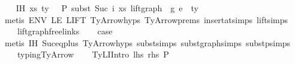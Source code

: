 \begin{isabellebody}
\isanewline
\ \ \isamarkupfalse%
\ IH{\isacharcolon}{\kern0pt}\ {\isachardoublequoteopen}{\isacharparenleft}{\kern0pt}xs{\isacharprime}{\kern0pt}{\isacharcomma}{\kern0pt}\ ty{}{\isacharprime}{\kern0pt}{\isacharparenright}{\kern0pt}\ {\isacharhash}{\kern0pt}\ {\isasymGamma}{}\ {\isasymturnstile}{\isacharbraceleft}{\kern0pt}P{\isacharbraceright}{\kern0pt}\ {\isacharparenleft}{\kern0pt}subst\ {\isacharparenleft}{\kern0pt}Suc\ i{\isacharparenright}{\kern0pt}\ xs\ {\isacharparenleft}{\kern0pt}lift{\isacharunderscore}{\kern0pt}graph\ {}\ g{}{\isacharparenright}{\kern0pt}{\isacharparenright}{\kern0pt}\ e{\isacharprime}{\kern0pt}\ {\isacharcolon}{\kern0pt}\ ty{}{\isacharprime}{\kern0pt}{\isachardoublequoteclose}\isanewline
\ \ \ \ \isamarkupfalse%
\ {\isacharparenleft}{\kern0pt}metis\ ENV\ LE\ LIFT{}\ TyArrow{\isachardot}{\kern0pt}hyps{\isacharparenleft}{\kern0pt}{}{\isacharparenright}{\kern0pt}\ TyArrow{\isachardot}{\kern0pt}prems{\isacharparenleft}{\kern0pt}{}{\isacharcomma}{\kern0pt}{}{\isacharparenright}{\kern0pt}\ insert{\isacharunderscore}{\kern0pt}at{\isachardot}{\kern0pt}simps{\isacharparenleft}{\kern0pt}{}{\isacharparenright}{\kern0pt}\ lift{\isachardot}{\kern0pt}simps{\isacharparenleft}{\kern0pt}{}{\isacharparenright}{\kern0pt}\isanewline
\ \ \ \ lift{\isacharunderscore}{\kern0pt}graph{\isacharunderscore}{\kern0pt}freelinks{\isacharparenright}{\kern0pt}\isanewline
\ \ \isamarkupfalse%
\ {\isacharquery}{\kern0pt}case\isanewline
\ \ \ \ \isamarkupfalse%
\ {\isacharparenleft}{\kern0pt}metis\ IH\ Suc{\isacharunderscore}{\kern0pt}eq{\isacharunderscore}{\kern0pt}plus{}\ TyArrow{\isachardot}{\kern0pt}hyps{\isacharparenleft}{\kern0pt}{}{\isacharcomma}{\kern0pt}{}{\isacharparenright}{\kern0pt}\ subst{\isachardot}{\kern0pt}simps{\isacharparenleft}{\kern0pt}{}{\isacharparenright}{\kern0pt}\ subst{\isacharunderscore}{\kern0pt}graph{\isachardot}{\kern0pt}simps{\isacharparenleft}{\kern0pt}{}{\isacharparenright}{\kern0pt}\ subst{\isacharunderscore}{\kern0pt}p{\isachardot}{\kern0pt}simps{\isacharparenleft}{\kern0pt}{}{\isacharparenright}{\kern0pt}\isanewline
\ \ \ \ typing{\isachardot}{\kern0pt}TyArrow{\isacharparenright}{\kern0pt}\isanewline
{}\isamarkupfalse%
\isanewline
\ \ \isamarkupfalse%
\ {\isacharparenleft}{\kern0pt}TyLIIntro\ lhs\ rhs\ P\ {\isasymGamma}{\isacharparenright}{\kern0pt}\isanewline

\end{isabellebody}
